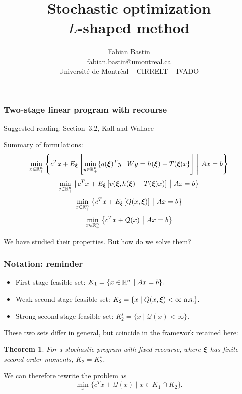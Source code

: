 \documentclass[aspectratio=169]{beamer}
\author[Fabian Bastin]{Fabian Bastin \\ \url{fabian.bastin@umontreal.ca} \\ Université de Montréal -- CIRRELT -- IVADO}
\date{}
\title[\texorpdfstring{$L$-shaped}{L-shaped} method]{Stochastic optimization\\\texorpdfstring{$L$-shaped}{L-shaped} method}
\newtheorem{theo}[theorem]{Theorem}
\begin{document}
\frame{\titlepage}

\begin{frame}
\frametitle{Two-stage linear program with recourse}

{\red Suggested reading: Section~3.2, Kall and Wallace}

\mbox{}

Summary of formulations:
\[
\min_{x \in \RR^n_+} \left\lbrace c^Tx + E_{\bsxi} \left[ \min_{y \in \RR^p_+} \lbrace q(\bsxi)^Ty \mid Wy = h(\bsxi) - T(\bsxi)x \rbrace \right] \ \middle|\ Ax = b \right\rbrace 
\]
\[
\min_{x \in {\mathbb{R}}^n_+} \left\lbrace c^Tx + E_{{\boldsymbol{\xi}}}
  \left[  v({\boldsymbol{\xi}}, h({\boldsymbol{\xi}})-T({\boldsymbol{\xi}})x) \right] \ \middle|\ Ax = b \right\rbrace 
\]
\[
\min_{x \in {\mathbb{R}}^n_+} \left\lbrace c^Tx + E_{{\boldsymbol{\xi}}} \left[ Q(x,{\boldsymbol{\xi}}) \right] \ \middle|\ Ax = b \right\rbrace 
\]
\[
\min_{x \in {\mathbb{R}}^n_+} \left\lbrace c^Tx + \mathcal{Q}(x)
  \ \middle|\ Ax = b \right\rbrace 
\]

We have studied their properties. But how do we solve them?

\end{frame}

\begin{frame}
\frametitle{Notation: reminder}

\begin{itemize}
\item
First-stage feasible set:
$
K_1 = \lbrace x \in {\mathbb{R}}^n_+ \mid Ax = b \rbrace.
$
\item
{\red Weak} second-stage feasible set:
$
K_2 = \lbrace x \mid Q(x,{\boldsymbol{\xi}}) < \infty \text{ a.s.} \rbrace.
$
\item
{\red Strong} second-stage feasible set:
$
K_2^s = \lbrace x \mid \mathcal{Q}(x) < \infty \rbrace.
$
\end{itemize}
These two sets differ in general, but coincide in the framework retained here:
\begin{theo}
For a stochastic program with fixed recourse, where ${\boldsymbol{\xi}}$ has finite second-order moments, $K_2 = K_2^s$.
\end{theo}
We can therefore rewrite the problem as
\[
\min_x \lbrace c^Tx + \mathcal{Q}(x) \mid x \in K_1 \cap K_2 \rbrace.
\]

\end{frame}
\end{document}

